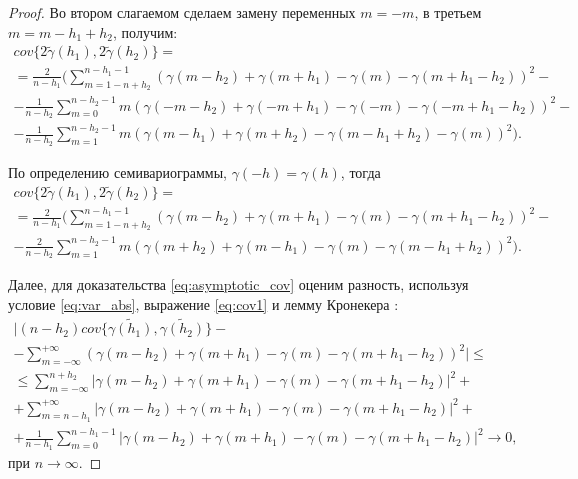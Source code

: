 \begin{proof}
Во втором слагаемом сделаем замену переменных $ m = -m $, в третьем $ m = m - h_1 + h_2 $, получим:
\begin{equation*}\begin{gathered}
	cov\{ 2 \tilde{\gamma}(h_1), 2 \tilde{\gamma}(h_2) \} = \\
	= \frac{2}{n - h_1} (\sum_{m = 1 - n + h_2}^{n - h_1 - 1} (\gamma(m - h_2) + \gamma(m + h_1) - \gamma(m) - \gamma(m + h_1 - h_2))^2 - \\
	- \frac{1}{n - h_2} \sum_{m = 0}^{n - h_2 - 1} m (\gamma(-m - h_2) + \gamma(-m + h_1) - \gamma(-m) - \gamma(-m + h_1 - h_2))^2 - \\
	- \frac{1}{n - h_2} \sum_{m = 1}^{n - h_2 - 1} m (\gamma(m - h_1) + \gamma(m + h_2) - \gamma(m - h_1 + h_2) - \gamma(m))^2).
\end{gathered}\end{equation*}

По определению семивариограммы, $ \gamma(-h) = \gamma(h) $, тогда
\begin{equation}\begin{gathered}
\label{eq:cov2}
	cov\{ 2 \tilde{\gamma}(h_1), 2 \tilde{\gamma}(h_2) \} = \\
	= \frac{2}{n - h_1} (\sum_{m = 1 - n + h_2}^{n - h_1 - 1} (\gamma(m - h_2) + \gamma(m + h_1) - \gamma(m) - \gamma(m + h_1 - h_2))^2 - \\
	- \frac{2}{n - h_2} \sum_{m = 1}^{n - h_2 - 1} m (\gamma(m + h_2) + \gamma(m - h_1) - \gamma(m) - \gamma(m - h_1 + h_2))^2).
\end{gathered}\end{equation}

Далее, для доказательства \eqref{eq:asymptotic_cov} оценим разность, используя условие \eqref{eq:var_abs}, выражение \eqref{eq:cov1} и лемму Кронекера \cite{shiryaev1980}:
\begin{equation}\begin{gathered}
\label{eq:asyfirst}
	\vert (n - h_2) cov \{ \tilde{\gamma(h_1)}, \tilde{\gamma(h_2)} \} - \\
	- \sum_{m = -\infty}^{+ \infty} (\gamma(m - h_2) + \gamma(m + h_1) - \gamma(m) - \gamma(m + h_1 - h_2))^2 \vert \leq \\
	\leq \sum_{m = -\infty}^{n + h_2} \vert \gamma(m - h_2) + \gamma(m + h_1) - \gamma(m) - \gamma(m + h_1 - h_2) \vert^2 + \\
	+ \sum_{m = n - h_1}^{+ \infty} \vert \gamma(m - h_2) + \gamma(m + h_1) - \gamma(m) - \gamma(m + h_1 - h_2) \vert^2 + \\
	+ \frac{1}{n - h_1} \sum_{m = 0}^{n - h_1 - 1} \vert \gamma(m - h_2) + \gamma(m + h_1) - \gamma(m) - \gamma(m + h_1 - h_2) \vert^2 \to 0,
\end{gathered}\end{equation}
при $ n \to \infty$.


\end{proof}
